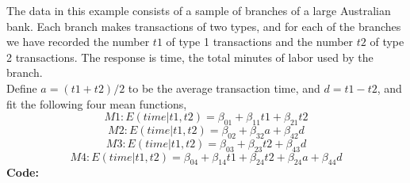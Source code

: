 \documentclass[12pt]{article}
\makeatletter
\theoremstyle{homework}
\newenvironment{exercise}[1]
{\def\@currentlabel{#1}\exercisecore}
{\endexercisecore}
\makeatother
\begin{document}
\begin{exercise}{4.2} The data in this example consists of a sample of branches of a large Australian bank. 
  Each branch makes transactions of two types, and for each of the branches we have recorded the number $t1$ 
  of type 1 transactions and the number $t2$ of type 2 transactions. The response is time, the total minutes 
  of labor used by the branch.\\
  Define $a = (t1 + t2)/2$ to be the average transaction time, and $d = t1-t2$, and fit the following four mean functions, 
  \begin{equation*}
    M1:E(time|t1,t2) = \beta_{01} + \beta_{11}t1 + \beta_{21}t2
  \end{equation*} 
  \begin{equation*}
    M2:E(time|t1,t2) = \beta_{02} + \beta_{32}a + \beta_{42}d
  \end{equation*} 
  \begin{equation*}
    M3:E(time|t1,t2) = \beta_{03} + \beta_{23}t2 + \beta_{43}d
  \end{equation*} 
  \begin{equation*}
    M4:E(time|t1,t2) = \beta_{04} + \beta_{14}t1 + \beta_{24}t2 + \beta_{24}a + \beta_{44}d
  \end{equation*} 
  \textbf{Code:}
  \begin{center}
  
  \end{center} 
  \newpage

  \begin{enumerate}


\end{enumerate}
\end{exercise}
\end{document}

